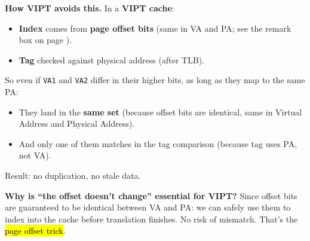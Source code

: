 \highspace
\textcolor{Green3}{ \textbf{How VIPT avoids this.}} In a \textbf{VIPT cache}:
\begin{itemize}
    \item \textbf{Index} comes from \textbf{page offset bits} (same in VA and PA; see the remark box on page \pageref{remarkbox: VA and PP}).
    \item \textbf{Tag} checked against physical address (after TLB).
\end{itemize}
So even if \texttt{VA1} and \texttt{VA2} differ in their higher bits, as long as they map to the same PA:
\begin{itemize}
    \item They land in the \textbf{same set} (because offset bits are identical, same in Virtual Address and Physical Address).
    \item And only one of them matches in the tag comparison (because tag uses PA, not VA).
\end{itemize}
Result: no duplication, no stale data.

\highspace
\textcolor{Green3}{ \textbf{Why is ``the offset doesn't change'' essential for VIPT?}} Since offset bits are guaranteed to be identical between VA and PA: we can safely use them to index into the cache before translation finishes. No risk of mismatch. That's the \hl{page offset trick}.

